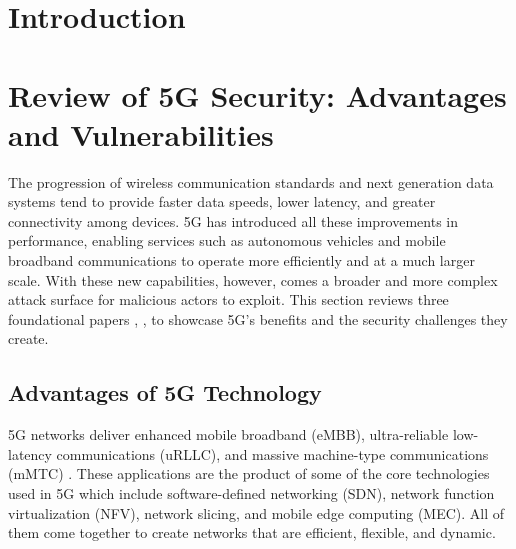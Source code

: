 \documentclass[acmtog]{acmart}
\begin{document}

\maketitle

\section{Introduction}

\section{Review of 5G Security: Advantages and Vulnerabilities}
The progression of wireless communication standards and next generation data systems tend to provide faster data speeds, lower latency, and greater connectivity among devices. 5G has introduced all these improvements in performance, enabling services such as autonomous vehicles and mobile broadband communications to operate more efficiently and at a much larger scale. With these new capabilities, however, comes a broader and more complex attack surface for malicious actors to exploit. This section reviews three foundational papers \cite{ref3}, \cite{ref6}, \cite{ref7} to showcase 5G's benefits and the security challenges they create.

\subsection{Advantages of 5G Technology}
5G networks deliver enhanced mobile broadband (eMBB), ultra-reliable low-latency communications (uRLLC), and massive machine-type communications (mMTC) \cite{ref6}. These applications are the product of some of the core technologies used in 5G which include software-defined networking (SDN), network function virtualization (NFV), network slicing, and mobile edge computing (MEC). All of them come together to create networks that are efficient, flexible, and dynamic. 
\end{document}

